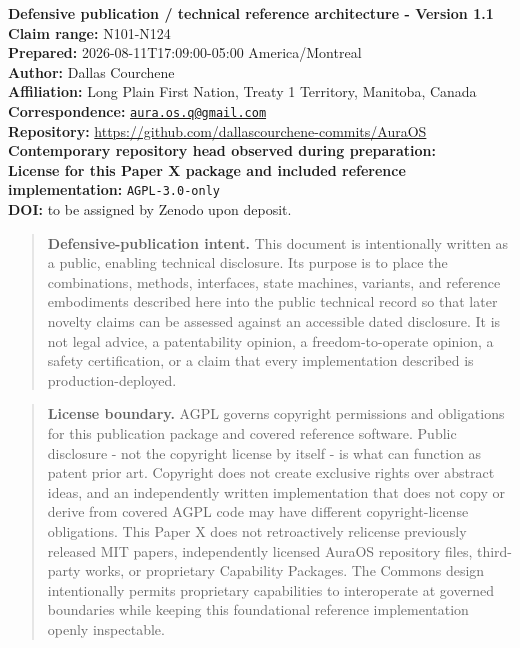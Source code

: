 \documentclass[
  10pt,
  letterpaper,
]{article}
\begin{document}
\textbf{Defensive publication / technical reference architecture -
Version 1.1}\\
\textbf{Claim range:} N101-N124\\
\textbf{Prepared:} 2026-08-11T17:09:00-05:00 America/Montreal\\
\textbf{Author:} Dallas Courchene\\
\textbf{Affiliation:} Long Plain First Nation, Treaty 1 Territory,
Manitoba, Canada\\
\textbf{Correspondence:}
\href{mailto:aura.os.q@gmail.com}{\nolinkurl{aura.os.q@gmail.com}}\\
\textbf{Repository:}
\url{https://github.com/dallascourchene-commits/AuraOS}\\
\textbf{Contemporary repository head observed during preparation:}
\texttt{}\\
\textbf{License for this Paper X package and included reference
implementation:} \nolinkurl{AGPL-3.0-only}\\
\textbf{DOI:} to be assigned by Zenodo upon deposit.

\begin{quote}
\textbf{Defensive-publication intent.} This document is intentionally
written as a public, enabling technical disclosure. Its purpose is to
place the combinations, methods, interfaces, state machines, variants,
and reference embodiments described here into the public technical
record so that later novelty claims can be assessed against an
accessible dated disclosure. It is not legal advice, a patentability
opinion, a freedom-to-operate opinion, a safety certification, or a
claim that every implementation described is production-deployed.
\end{quote}

\begin{quote}
\textbf{License boundary.} AGPL governs copyright permissions and
obligations for this publication package and covered reference software.
Public disclosure - not the copyright license by itself - is what can
function as patent prior art. Copyright does not create exclusive rights
over abstract ideas, and an independently written implementation that
does not copy or derive from covered AGPL code may have different
copyright-license obligations. This Paper X does not retroactively
relicense previously released MIT papers, independently licensed AuraOS
repository files, third-party works, or proprietary Capability Packages.
The Commons design intentionally permits proprietary capabilities to
interoperate at governed boundaries while keeping this foundational
reference implementation openly inspectable.
\end{quote}
\end{document}
